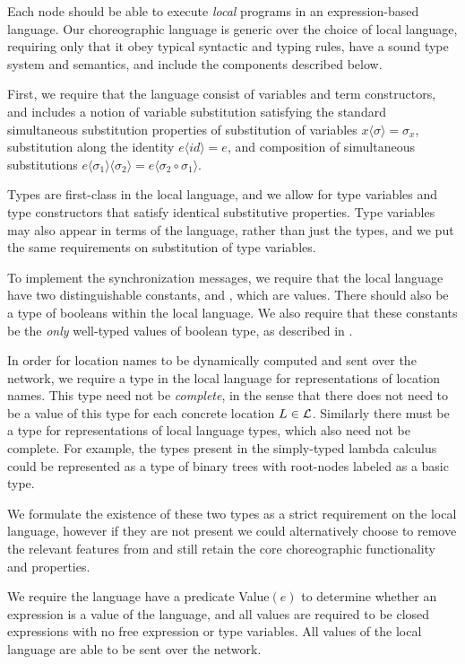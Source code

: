 Each node should be able to execute \emph{local} programs in an expression-based language.
Our choreographic language is generic over the choice of local language, requiring only that it obey typical syntactic and typing rules, have a sound type system and semantics, and include the components described below.

First, we require that the language consist of variables and term constructors, and includes a notion of variable substitution satisfying the standard simultaneous substitution properties of substitution of variables $x \langle \sigma \rangle = \sigma_x$, substitution along the identity $e \langle  id \rangle = e$, and composition of simultaneous substitutions $e \langle \sigma_1 \rangle \langle \sigma_2 \rangle = e \langle \sigma_2 \circ \sigma_1 \rangle$.

Types are first-class in the local language, and we allow for type variables and type constructors that satisfy identical substitutive properties.
Type variables may also appear in terms of the language, rather than just the types, and we put the same requirements on substitution of type variables.

To implement the synchronization messages, we require that the local language have two distinguishable constants, \True and \False, which are values.
There should also be a type \Bool of booleans within the local language.
We also require that these constants be the \emph{only} well-typed values of boolean type, as described in \todo.

In order for location names to be dynamically computed and sent over the network, we require a type \Loc in the local language for representations of location names.
This type need not be \emph{complete}, in the sense that there does not need to be a value of this type for each concrete location $L \in \mathcal{L}$.
Similarly there must be a type \Typ for representations of local language types, which also need not be complete.
For example, the types present in the simply-typed lambda calculus could be represented as a type of binary trees with root-nodes labeled as a basic type.

We formulate the existence of these two types as a strict requirement on the local language, however if they are not present we could alternatively choose to remove the relevant features from \langname and still retain the core choreographic functionality and properties.

We require the language have a predicate Value$(e)$ to determine whether an expression is a value of the language, and all values are required to be closed expressions with no free expression or type variables.
All values of the local language are able to be sent over the network.

